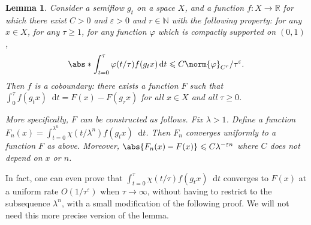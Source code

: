 \documentclass[11pt, a4paper, oneside, final, pagebackref]{amsart}
\newcommand{\N}{\mathbb{N}}
\newcommand{\R}{\mathbb{R}}
\newcommand{\dd}{\mathop{}\!\mathrm{d}}
\renewcommand{\epsilon}{\varepsilon}
\renewcommand{\phi}{\varphi}
\renewcommand{\leq}{\leqslant}
\renewcommand{\geq}{\geqslant}
\newtheorem{lem}[thm]{Lemma}
\theoremstyle{definition}
\numberwithin{equation}{section}
\begin{document}
\begin{lem}
\label{lem:GL_coboundary} Consider a semiflow $g_t$ on a space $X$, and a
function $f:X \to \R$ for which there exist $C>0$ and $\epsilon>0$ and $r\in
\N$ with the following property: for any $x \in X$, for any $\tau\geq 1$, for
any function $\phi$ which is compactly supported on $(0,1)$,
\begin{equation}
\label{eq:ziuerpoiuprt}
  \abs*{\int_{t=0}^\tau \phi(t/\tau) f(g_t x) \dd t} \leq C\norm{\phi}_{C^r}/\tau^\epsilon.
\end{equation}
Then $f$ is a coboundary: there exists a function $F$ such that $\int_0^\tau
f(g_t x) \dd t = F(x) - F(g_\tau x)$ for all $x\in X$ and all $\tau \geq 0$.

More specifically, $F$ can be constructed as follows. Fix $\lambda > 1$.
Define a function $F_n(x) = \int_{t=0}^{\lambda^n} \chi(t/\lambda^n) f(g_t x)
\dd t$. Then $F_n$ converges uniformly to a function $F$ as above. Moreover,
$\abs{F_n(x)-F(x)} \leq C \lambda^{-\epsilon n}$ where $C$ does not depend on
$x$ or $n$.
\end{lem}
In fact, one can even prove that $\int_{t=0}^{\tau} \chi(t/\tau) f(g_t x) \dd
t$ converges to $F(x)$ at a uniform rate $O(1/\tau^\epsilon)$ when $\tau\to
\infty$, without having to restrict to the subsequence $\lambda^n$, with a
small modification of the following proof. We will not need this more precise
version of the lemma.
\end{document}

